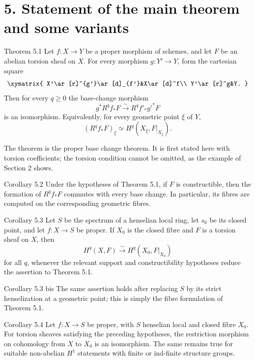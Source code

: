 \section*{5. Statement of the main theorem and some variants}

\begin{statement}{Theorem 5.1}
Let \(f:X\to Y\) be a proper morphism of schemes, and let \(F\) be an abelian torsion sheaf on \(X\). For every morphism \(g:Y'\to Y\), form the cartesian square
\[
\xymatrix{
X'\ar[r]^{g'}\ar[d]_{f'}&X\ar[d]^f\\
Y'\ar[r]^g&Y.
}
\]
Then for every \(q\geq0\) the base-change morphism
\[
g^*R^qf_*F\xrightarrow{\sim}R^qf'_*g'^*F
\]
is an isomorphism. Equivalently, for every geometric point \(\xi\) of \(Y\),
\[
(R^qf_*F)_\xi\simeq H^q(X_\xi,F|_{X_\xi}).
\]
\end{statement}

The theorem is the proper base change theorem. It is first stated here with torsion coefficients; the torsion condition cannot be omitted, as the example of Section 2 shows.

\begin{statement}{Corollary 5.2}
Under the hypotheses of Theorem 5.1, if \(F\) is constructible, then the formation of \(R^qf_*F\) commutes with every base change. In particular, its fibres are computed on the corresponding geometric fibres.
\end{statement}

\begin{statement}{Corollary 5.3}
Let \(S\) be the spectrum of a henselian local ring, let \(s_0\) be its closed point, and let \(f:X\to S\) be proper. If \(X_0\) is the closed fibre and \(F\) is a torsion sheaf on \(X\), then
\[
H^q(X,F)\xrightarrow{\sim}H^q(X_0,F|_{X_0})
\]
for all \(q\), whenever the relevant support and constructibility hypotheses reduce the assertion to Theorem 5.1.
\end{statement}

\begin{statement}{Corollary 5.3 bis}
The same assertion holds after replacing \(S\) by its strict henselization at a geometric point; this is simply the fibre formulation of Theorem 5.1.
\end{statement}

\begin{statement}{Corollary 5.4}
Let \(f:X\to S\) be proper, with \(S\) henselian local and closed fibre \(X_0\). For torsion sheaves satisfying the preceding hypotheses, the restriction morphism on cohomology from \(X\) to \(X_0\) is an isomorphism. The same remains true for suitable non-abelian \(H^1\) statements with finite or ind-finite structure groups.
\end{statement}

